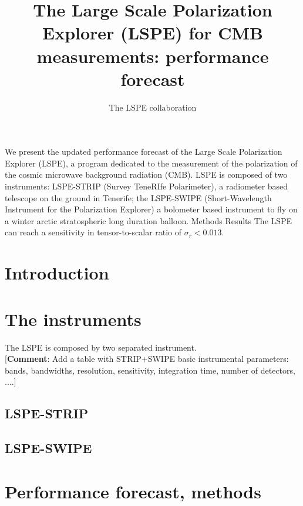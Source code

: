 \documentclass{aa}
\newcommand{\comment}[1]{{\textcolor[rgb]{1, 0, 0}{[{\bf Comment}: #1]}}}
\begin{document}
\title{The Large Scale Polarization Explorer (LSPE) for CMB measurements: performance forecast}
\author{The LSPE collaboration}
\date{}

{We present the updated performance forecast of the Large Scale Polarization Explorer (LSPE),
a program dedicated to the measurement of the polarization of the cosmic microwave
background radiation (CMB). LSPE is composed of two instruments: LSPE-STRIP 
(Survey TeneRIfe Polarimeter), a radiometer based telescope on the ground in Tenerife; 
the LSPE-SWIPE (Short-Wavelength Instrument for 
the Polarization Explorer) a bolometer based instrument to fly on a winter arctic stratospheric 
long duration balloon.}
{Methods}
{Results}
{The LSPE can reach a sensitivity in tensor-to-scalar ratio of $\sigma_r<0.013$.} 



\maketitle

\tableofcontents

\section{Introduction}




\section{The instruments}\label{sec:instruments}
The LSPE is composed by two separated instrument. 
\\ \comment{Add a table with STRIP+SWIPE basic instrumental parameters: bands, bandwidths, 
resolution, sensitivity, integration time, number of detectors, ....}

\subsection{LSPE-STRIP}


\subsection{LSPE-SWIPE}


\section{Performance forecast, methods}\label{sec:methods}

\end{document}
